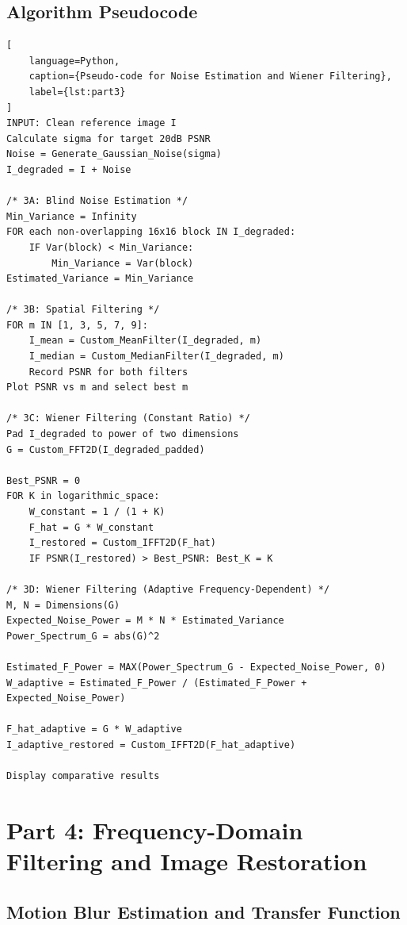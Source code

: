\documentclass[11pt,a4paper]{article}
\begin{document}
\subsection{Algorithm Pseudocode}
\begin{lstlisting}[
    language=Python,
    caption={Pseudo-code for Noise Estimation and Wiener Filtering},
    label={lst:part3}
]
INPUT: Clean reference image I
Calculate sigma for target 20dB PSNR
Noise = Generate_Gaussian_Noise(sigma)
I_degraded = I + Noise

/* 3A: Blind Noise Estimation */
Min_Variance = Infinity
FOR each non-overlapping 16x16 block IN I_degraded:
    IF Var(block) < Min_Variance:
        Min_Variance = Var(block)
Estimated_Variance = Min_Variance

/* 3B: Spatial Filtering */
FOR m IN [1, 3, 5, 7, 9]:
    I_mean = Custom_MeanFilter(I_degraded, m)
    I_median = Custom_MedianFilter(I_degraded, m)
    Record PSNR for both filters
Plot PSNR vs m and select best m

/* 3C: Wiener Filtering (Constant Ratio) */
Pad I_degraded to power of two dimensions
G = Custom_FFT2D(I_degraded_padded)

Best_PSNR = 0
FOR K in logarithmic_space:
    W_constant = 1 / (1 + K)
    F_hat = G * W_constant
    I_restored = Custom_IFFT2D(F_hat)
    IF PSNR(I_restored) > Best_PSNR: Best_K = K

/* 3D: Wiener Filtering (Adaptive Frequency-Dependent) */
M, N = Dimensions(G)
Expected_Noise_Power = M * N * Estimated_Variance
Power_Spectrum_G = abs(G)^2

Estimated_F_Power = MAX(Power_Spectrum_G - Expected_Noise_Power, 0)
W_adaptive = Estimated_F_Power / (Estimated_F_Power + Expected_Noise_Power)

F_hat_adaptive = G * W_adaptive
I_adaptive_restored = Custom_IFFT2D(F_hat_adaptive)

Display comparative results
\end{lstlisting}


\clearpage




\section{Part 4: Frequency-Domain Filtering and Image Restoration}

\subsection{Motion Blur Estimation and Transfer Function}
\end{document}
